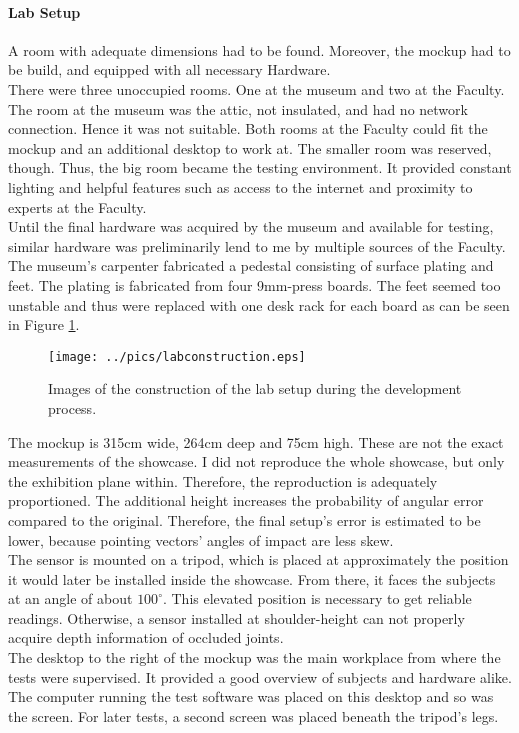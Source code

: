 \paragraph{Lab Setup} A room with adequate dimensions had to be found. Moreover, the mockup had to be build, and equipped with all necessary Hardware. 
\\
There were three unoccupied rooms. One at the museum and two at the Faculty. The room at the museum was the attic, not insulated, and had no network connection. Hence it was not suitable. Both rooms at the Faculty could fit the mockup and an additional desktop to work at. The smaller room was reserved, though. Thus, the big room became the testing environment. It provided constant lighting and helpful features such as access to the internet and proximity to experts at the Faculty.
\\
Until the final hardware was acquired by the museum and available for testing, similar hardware was preliminarily lend to me by multiple sources of the Faculty. The museum's carpenter fabricated a pedestal consisting of surface plating and feet. The plating is fabricated from four 9mm-press boards. The feet seemed too unstable and thus were replaced with one desk rack for each board as can be seen in Figure \ref{fig:lab_setup}.
\begin{figure}[H]%
\texttt{[image: ../pics/labconstruction.eps]}%
\caption{Images of the construction of the lab setup during the development process.}%
\label{fig:lab_setup} %
\end{figure}

The mockup is 315cm wide, 264cm deep and 75cm high. These are not the exact measurements of the showcase. I did not reproduce the whole showcase, but only the exhibition plane within. Therefore, the reproduction is adequately proportioned. The additional height increases the probability of angular error compared to the original. Therefore, the final setup's error is estimated to be lower, because pointing vectors' angles of impact are less skew.  
\\
The sensor is mounted on a tripod, which is placed at approximately the position it would later be installed inside the showcase. From there, it faces the subjects at an angle of about $100^\circ$. This elevated position is necessary to get reliable readings. Otherwise, a sensor installed at shoulder-height can not properly acquire depth information of occluded joints.
\\
The desktop to the right of the mockup was the main workplace from where the tests were supervised. It provided a good overview of subjects and hardware alike. The computer running the test software was placed on this desktop and so was the screen. For later tests, a second screen was placed beneath the tripod's legs.

